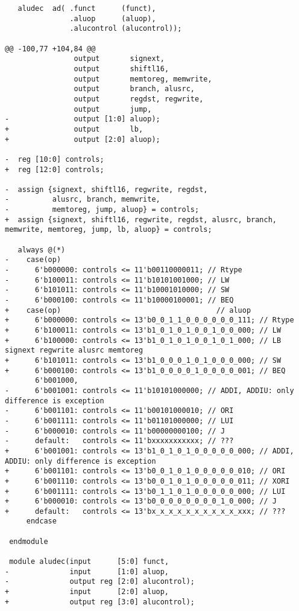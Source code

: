 \begin{verbatim}
   aludec  ad( .funct      (funct), 
               .aluop      (aluop), 
               .alucontrol (alucontrol));
 
@@ -100,77 +104,84 @@
                output       signext,
                output       shiftl16,
                output       memtoreg, memwrite,
                output       branch, alusrc,
                output       regdst, regwrite,
                output       jump,
-               output [1:0] aluop);
+               output       lb,
+               output [2:0] aluop);
 
-  reg [10:0] controls;
+  reg [12:0] controls;
 
-  assign {signext, shiftl16, regwrite, regdst, 
-          alusrc, branch, memwrite,
-          memtoreg, jump, aluop} = controls;
+  assign {signext, shiftl16, regwrite, regdst, alusrc, branch, memwrite, memtoreg, jump, lb, aluop} = controls;
 
   always @(*)
-    case(op)
-      6'b000000: controls <= 11'b00110000011; // Rtype
-      6'b100011: controls <= 11'b10101001000; // LW
-      6'b101011: controls <= 11'b10001010000; // SW
-      6'b000100: controls <= 11'b10000100001; // BEQ
+    case(op)                                    // aluop
+      6'b000000: controls <= 13'b0_0_1_1_0_0_0_0_0_0_111; // Rtype
+      6'b100011: controls <= 13'b1_0_1_0_1_0_0_1_0_0_000; // LW
+      6'b100000: controls <= 13'b1_0_1_0_1_0_0_1_0_1_000; // LB  signext regwrite alusrc memtoreg
+      6'b101011: controls <= 13'b1_0_0_0_1_0_1_0_0_0_000; // SW
+      6'b000100: controls <= 13'b1_0_0_0_0_1_0_0_0_0_001; // BEQ
       6'b001000, 
-      6'b001001: controls <= 11'b10101000000; // ADDI, ADDIU: only difference is exception
-      6'b001101: controls <= 11'b00101000010; // ORI
-      6'b001111: controls <= 11'b01101000000; // LUI
-      6'b000010: controls <= 11'b00000000100; // J
-      default:   controls <= 11'bxxxxxxxxxxx; // ???
+      6'b001001: controls <= 13'b1_0_1_0_1_0_0_0_0_0_000; // ADDI, ADDIU: only difference is exception
+      6'b001101: controls <= 13'b0_0_1_0_1_0_0_0_0_0_010; // ORI
+      6'b001110: controls <= 13'b0_0_1_0_1_0_0_0_0_0_011; // XORI
+      6'b001111: controls <= 13'b0_1_1_0_1_0_0_0_0_0_000; // LUI
+      6'b000010: controls <= 13'b0_0_0_0_0_0_0_0_1_0_000; // J
+      default:   controls <= 13'bx_x_x_x_x_x_x_x_x_x_xxx; // ???
     endcase
 
 endmodule
 
 module aludec(input      [5:0] funct,
-              input      [1:0] aluop,
-              output reg [2:0] alucontrol);
+              input      [2:0] aluop,
+              output reg [3:0] alucontrol);
 

\end{verbatim}
